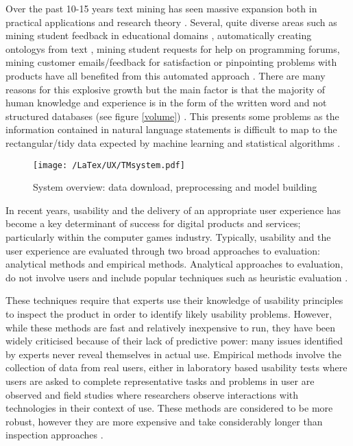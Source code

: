 \documentclass{svproc}
\begin{document}
Over the past 10-15 years text mining has seen massive expansion both in practical applications and research theory \cite{Hearst99}. Several, quite diverse areas such as mining student feedback in educational domains \cite{Romero2010,Kumar2015}, automatically creating ontologys from text \cite{Missikoff03}, mining student requests for help on programming forums\cite{Joorabchi2016,Wong2013}, mining customer emails/feedback for satisfaction or pinpointing problems with products have all benefited from this automated approach \cite{Liao2010}.  There are many reasons for this explosive growth but the main factor is that the majority of human knowledge and experience is in the form of the written word and not structured databases (see figure \ref{volume}) \cite{Bose2017}. This presents some problems as the information contained in natural language statements is difficult to map to the rectangular/tidy data expected by machine learning and statistical algorithms \cite{Whickham2011}. 

\begin{figure}[ht]
  \begin{center}
 \texttt{[image: /LaTex/UX/TMsystem.pdf]} %
  \end{center}
 \caption{System overview: data download, preprocessing and model building}
\label{system}
\end{figure}

In recent years, usability and the delivery of an appropriate user experience has become a key determinant of success for digital products and services; particularly within the computer games industry.  Typically, usability and the user experience are evaluated through two broad approaches to evaluation: analytical methods and empirical methods.   Analytical approaches to evaluation, do not involve users and include popular techniques such as heuristic evaluation \cite{Nielsen1993}.  


These techniques require that experts use their knowledge of usability principles to inspect the product in order to identify likely usability problems.  However, while these methods are fast and relatively inexpensive to run, they have been widely criticised because of their lack of predictive power: many issues identified by experts never reveal themselves in actual use.  Empirical methods involve the collection of data from real users, either in laboratory based usability tests where users are asked to complete representative tasks and problems in user are observed and field studies where researchers observe interactions with technologies in their context of use.  These methods are considered to be more robust, however they are more expensive and take considerably longer than inspection approaches \cite{McDonald2013}.
\end{document}
